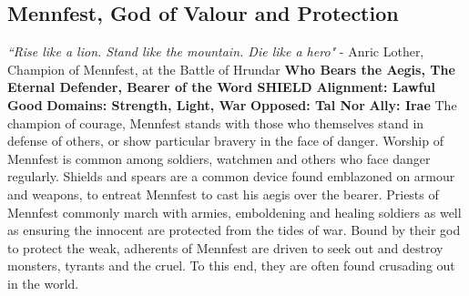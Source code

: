 \subsection{Mennfest,  God of Valour and Protection}\label{god:mennfest}
\textit{“Rise like a lion. Stand like the mountain. Die like a hero"}
\break
\hspace*{\fill} - Anric Lother, Champion of Mennfest, at the Battle of Hrundar
\break
\break
\textbf{Who Bears the Aegis, The Eternal Defender, Bearer of the Word SHIELD}\break
\hspace*{\fill}\break
\textbf{Alignment:\hspace*{\fill} Lawful Good} \break
\textbf{Domains:\hspace*{\fill} Strength, Light, War} \break
\textbf{Opposed:\hspace*{\fill} Tal Nor} \break
\textbf{Ally:\hspace*{\fill} Irae} \break
\hspace*{\fill}\break
The champion of courage, Mennfest stands with those who themselves stand in defense of others, or show particular bravery in the face of danger. \newline
Worship of Mennfest is common among soldiers, watchmen and others who face danger regularly. Shields and spears are a common device found emblazoned on armour and weapons, to entreat Mennfest to cast his aegis over the bearer.  \newline
Priests of Mennfest commonly march with armies, emboldening and healing soldiers as well as ensuring the innocent are protected from the tides of war. Bound by their god to protect the weak, adherents of Mennfest are driven to seek out and destroy monsters, tyrants and the cruel. To this end, they are often found crusading out in the world.

